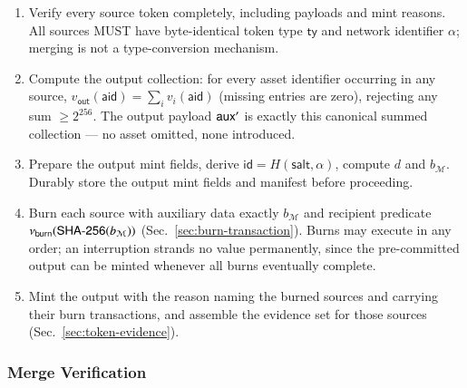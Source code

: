 \begin{enumerate}
	\item Verify every source token completely, including payloads and mint reasons. All sources MUST have byte-identical token type $\mathsf{ty}$ and network identifier $\alpha$; merging is not a type-conversion mechanism.
	\item Compute the output collection: for every asset identifier occurring in any source, $v_\mathsf{out}(\mathsf{aid}) = \sum_i v_i(\mathsf{aid})$ (missing entries are zero), rejecting any sum $\ge 2^{256}$. The output payload $\mathsf{aux}'$ is exactly this canonical summed collection --- no asset omitted, none introduced.
	\item Prepare the output mint fields, derive $\mathsf{id} = H(\mathsf{salt}, \alpha)$, compute $d$ and $b_\mathcal{M}$. Durably store the output mint fields and manifest before proceeding.
	\item Burn each source with auxiliary data exactly $b_\mathcal{M}$ and recipient predicate $\nu_\mathsf{burn}(\mathsf{SHA\text{-}256}(b_\mathcal{M}))$ (Sec.~\ref{sec:burn-transaction}). Burns may execute in any order; an interruption strands no value permanently, since the pre-committed output can be minted whenever all burns eventually complete.
	\item Mint the output with the reason naming the burned sources and carrying their burn transactions, and assemble the evidence set for those sources (Sec.~\ref{sec:token-evidence}).
\end{enumerate}

\subsubsection{Merge Verification}


